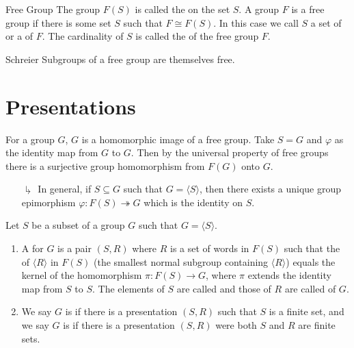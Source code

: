 \documentclass[12pt, a4paper, twoside, openright, titlepage]{book}
\begin{document}
\begin{defn}{Free Group}{}
        The group $F(S)$ is called the  on the set $S$. A group $F$ is a free group if there is some set $S$ such that $F \cong F(S)$. In this case we call $S$ a set of  or a  of $F$. The cardinality of $S$ is called the  of the free group $F$.
\end{defn}

\begin{thm}{Schreier}{}
        Subgroups of a free group are themselves free.
\end{thm}





        



\section{\textsection Presentations}


\begin{rmk}{}{}
        For a group $G$, $G$ is a homomorphic image of a free group. Take $S = G$ and $\varphi$ as the identity map from $G$ to $G$. Then by the universal property of free groups there is a surjective group homomorphism from $F(G)$ onto $G$.
        \begin{enumerate}
                \item[$\drsh$] In general, if $S \subseteq G$ such that $G = \langle S \rangle$, then there exists a unique group epimorphism $\varphi:F(S)\twoheadrightarrow G$ which is the identity on $S$.
        \end{enumerate}
\end{rmk}

\begin{defn}{}{}
        Let $S$ be a subset of a group $G$ such that $G = \langle S \rangle$. \begin{enumerate}
                \item A  for $G$ is a pair $(S,R)$ where $R$ is a set of words in $F(S)$ such that the  of $\langle R \rangle$ in $F(S)$ (the smallest normal subgroup containing $\langle R\rangle$) equals the kernel of the homomorphism $\pi:F(S)\rightarrow G$, where $\pi$ extends the identity map from $S$ to $S$. The elements of $S$ are called  and those of $R$ are called  of $G$.
                \item We say $G$ is  if there is a presentation $(S,R)$ such that $S$ is a finite set, and we say $G$ is  if there is a presentation $(S,R)$ were both $S$ and $R$ are finite sets.
        \end{enumerate}
\end{defn}
\end{document}
